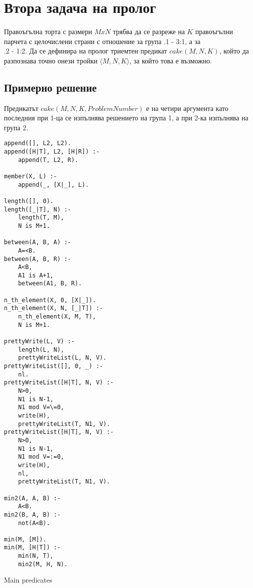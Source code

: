 \documentclass{article}
\newenvironment{longlisting}{\captionsetup{type=listing}}{}
\begin{document}
\newpage
\section{Втора задача на пролог}
\paragraph{\hspace{0.5em}} 
Правоъгълна торта с размери $MxN$ трябва да се разреже на $K$ правоъгълни парчета с целочислени страни с отношение за група .1 - 3:1, а за\\ .2 - 1:2. Да се дефинира на пролог триемтен предикат $cake(M, N, K)$, който да разпознава точно онези тройки $\langle M, N, K\rangle $, за който това е възможно.


\subsection{Примерно решение}
Предикатът $cake(M, N, K, ProblemNumber)$ е на четири аргумента като последния при 1-ца се изпълнява решението на група 1, а при 2-ка изпълнява на група 2.
\renewcommand{\figurename}{Listing}
  \begin{longlisting}
  \begin{verbatim}
append([], L2, L2).
append([H|T], L2, [H|R]) :-
    append(T, L2, R).

member(X, L) :-
    append(_, [X|_], L).

length([], 0).
length([_|T], N) :-
    length(T, M),
    N is M+1.

between(A, B, A) :-
    A=<B.
between(A, B, R) :-
    A<B,
    A1 is A+1,
    between(A1, B, R).

n_th_element(X, 0, [X|_]).
n_th_element(X, N, [_|T]) :-
    n_th_element(X, M, T),
    N is M+1.

prettyWrite(L, V) :-
    length(L, N),
    prettyWriteList(L, N, V).
prettyWriteList([], 0, _) :-
    nl.
prettyWriteList([H|T], N, V) :-
    N>0,
    N1 is N-1,
    N1 mod V=\=0,
    write(H),
    prettyWriteList(T, N1, V).
prettyWriteList([H|T], N, V) :-
    N>0,
    N1 is N-1,
    N1 mod V=:=0,
    write(H),
    nl,
    prettyWriteList(T, N1, V).

min2(A, A, B) :-
    A<B.
min2(B, A, B) :-
    not(A<B).

min(M, [M]).
min(M, [H|T]) :-
    min(N, T),
    min2(M, H, N).

\end{verbatim}
\caption{Main predicates}
\label{lst:secondListing}
\end{longlisting}
\end{document}
